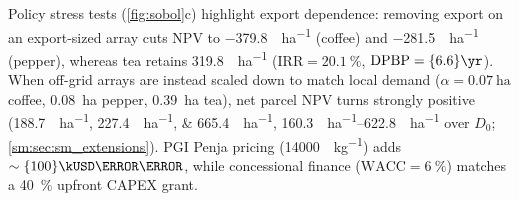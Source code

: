 \documentclass[preprint,12pt,a4paper]{elsarticle}
\begin{document}
\begin{table}[htbp]
 \centering
 \caption{Dual Saltelli--Sobol decomposition ($N=\num{10000}$ base samples, \num{140000} evaluations per crop) contrasting macro-financial drivers of standalone bankability ($\mathrm{NPV}_{\mathrm{OPV}}$) against hardware engineering drivers of comparative parity ($\Delta\mathrm{NPV} = \mathrm{NPV}_{\mathrm{OPV}} - \mathrm{NPV}_{\mathrm{Si}}$).}
 \label{tab:sobol_dual}
 \scriptsize
\end{table}

Policy stress tests (\cref{fig:sobol}c) highlight export dependence: removing export on an export-sized array cuts NPV to \qty{-379.8}{\kUSD\per\hectare} (coffee) and \qty{-281.5}{\kUSD\per\hectare} (pepper), whereas tea retains \qty{+319.8}{\kUSD\per\hectare} ($\mathrm{IRR} = \qty{20.1}{\percent}$, $\mathrm{DPBP}=\qty{6.6}{\yr}$). When off-grid arrays are instead scaled down to match local demand ($\alpha = \qty{0.07}{\hectare}$ coffee, \qty{0.08}{\hectare} pepper, \qty{0.39}{\hectare} tea), net parcel NPV turns strongly positive (\qtylist{+188.7;+227.4;+665.4}{\kUSD\per\hectare}, \qtyrange{+160.3}{+622.8}{\kUSD\per\hectare} over $D_0$; \cref{sm:sec:sm_extensions}). PGI Penja pricing (\qty{14000}{\XAF\per\kilogram}) adds $\sim\qty{100}{\kUSD\per\hectare}$, while concessional finance ($\mathrm{WACC} = \qty{6}{\percent}$) matches a \qty{40}{\percent} upfront CAPEX grant.
\end{document}
